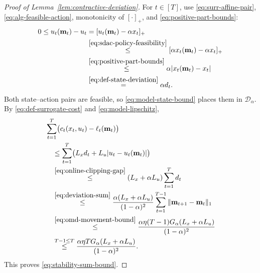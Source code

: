 \documentclass[journal]{IEEEtran}
\theoremstyle{remark}
\begin{document}
\begin{proof}[Proof of Lemma~\ref{lem:contractive-deviation}]
For $t\in[T]$, use \eqref{eq:surr-affine-pair},
\eqref{eq:alg-feasible-action}, monotonicity of $[\cdot]_+$, and
\eqref{eq:positive-part-bounds}:
\begin{equation}
\label{eq:online-clipping-gap}
\begin{aligned}
0\le u_t(\mathbf{m}_t)-u_t
&=[u_t(\mathbf{m}_t)-\alpha x_t]_+\\
&\overset{\eqref{eq:sdac-policy-feasibility}}{\le}
[\alpha x_t(\mathbf{m}_t)-\alpha x_t]_+\\
&\overset{\eqref{eq:positive-part-bounds}}{\le}
\alpha|x_t(\mathbf{m}_t)-x_t|\\
&\overset{\eqref{eq:def-state-deviation}}{=}\alpha d_t.
\end{aligned}
\end{equation}
Both state--action pairs are feasible, so \eqref{eq:model-state-bound}
places them in $\mathcal{D}_\alpha$. By \eqref{eq:def-surrogate-cost} and
\eqref{eq:model-lipschitz},
\[
\begin{aligned}
&\sum_{t=1}^T\bigl(c_t(x_t,u_t)-\ell_t(\mathbf{m}_t)\bigr)\\
&\quad\le
\sum_{t=1}^T\bigl(L_xd_t+L_u|u_t-u_t(\mathbf{m}_t)|\bigr)\\
&\quad\overset{\eqref{eq:online-clipping-gap}}{\le}
(L_x+\alpha L_u)\sum_{t=1}^T d_t\\
&\quad\overset{\eqref{eq:deviation-sum}}{\le}
\frac{\alpha(L_x+\alpha L_u)}{(1-\alpha)^2}
\sum_{t=1}^{T-1}\|\mathbf{m}_{t+1}-\mathbf{m}_t\|_1\\
&\quad\overset{\eqref{eq:omd-movement-bound}}{\le}
\frac{\alpha\eta(T-1)G_\alpha(L_x+\alpha L_u)}{(1-\alpha)^2}\\
&\quad\overset{T-1\le T}{\le}
\frac{\alpha\eta T G_\alpha(L_x+\alpha L_u)}{(1-\alpha)^2}.
\end{aligned}
\]
This proves \eqref{eq:stability-sum-bound}.
\end{proof}
\end{document}
